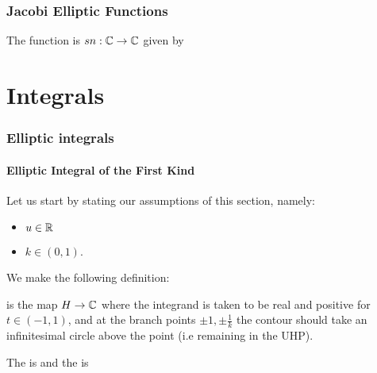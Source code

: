 \documentclass{article}
\begin{document}
\section{Jacobi Elliptic Functions}

\begin{definition}
	The  function is $sn:\mathbb{C} \to \mathbb{C}$ given by 
\end{definition}

\part{Integrals}

\section{Elliptic integrals}


\subsection{Elliptic Integral of the First Kind}
Let us start by stating our assumptions of this section, namely:
\begin{itemize}
	\item $u \in \mathbb{R}$
	\item $k \in (0,1)$.
\end{itemize}

We make the following definition:

\begin{definition}
	 is the map $H\to \mathbb{C}$
where the integrand is taken to be real and positive for $t \in (-1,1)$, and at the branch points $\pm 1, \pm \frac{1}{k}$ the contour should take an infinitesimal circle above the point (i.e remaining in the UHP). 
\end{definition}

\begin{definition}
	The  is 
	and the  is 
\end{definition}
\end{document}
